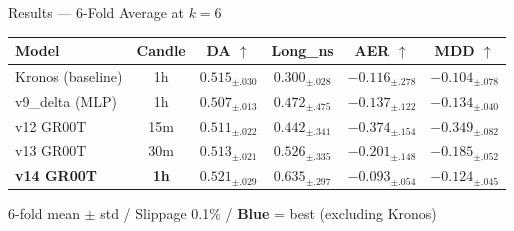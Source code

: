 \documentclass[aspectratio=169,11pt]{beamer}
\newcommand{\best}[1]{\textcolor{bestcol}{\textbf{#1}}}
\begin{document}
\begin{frame}{Results --- 6-Fold Average at $k=6$}
  \begin{table}
    \centering
    \renewcommand{\arraystretch}{1.4}
    \setlength{\tabcolsep}{5pt}
    \begin{tabular}{lc cccc}
      \toprule
      \textbf{Model} & \textbf{Candle} &
        \textbf{DA} $\uparrow$ & \textbf{Long\_ns} &
        \textbf{AER} $\uparrow$ & \textbf{MDD} $\uparrow$ \\
      \midrule
      \rowcolor{rowgray}
      Kronos (baseline) & 1h &
        $0.515_{\pm.030}$ & $0.300_{\pm.028}$ &
        $-0.116_{\pm.278}$ & $-0.104_{\pm.078}$ \\
      v9\_delta (MLP) & 1h &
        $0.507_{\pm.013}$ & $0.472_{\pm.475}$ &
        $-0.137_{\pm.122}$ & $-0.134_{\pm.040}$ \\
      \rowcolor{rowgray}
      v12 GR00T & 15m &
        $0.511_{\pm.022}$ & $0.442_{\pm.341}$ &
        $-0.374_{\pm.154}$ & $-0.349_{\pm.082}$ \\
      v13 GR00T & 30m &
        $0.513_{\pm.021}$ & $0.526_{\pm.335}$ &
        $-0.201_{\pm.148}$ & $-0.185_{\pm.052}$ \\
      \rowcolor{rowgray}
      \textbf{v14 GR00T} & \textbf{1h} &
        \best{$0.521_{\pm.029}$} & $0.635_{\pm.297}$ &
        \best{$-0.093_{\pm.054}$} & $-0.124_{\pm.045}$ \\
      \bottomrule
    \end{tabular}
    \par\vspace{0.3em}\centering\footnotesize 6-fold mean $\pm$ std / Slippage 0.1\% / \textcolor{bestcol}{\textbf{Blue}} = best (excluding Kronos)
  \end{table}
\end{frame}
\end{document}
